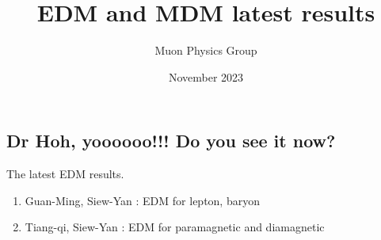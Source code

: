 \documentclass[12pt]{article}
\title{EDM and MDM latest results}
\author{Muon Physics Group}
\date{November 2023}
\begin{document}
\begin{landscape}

\section{Dr Hoh, yoooooo!!! Do you see it now?}

\noindent The latest EDM results.
\begin{enumerate}
\item Guan-Ming, Siew-Yan : EDM for lepton, baryon
\item Tiang-qi, Siew-Yan  : EDM for paramagnetic and diamagnetic
\end{enumerate}


\end{landscape}
\end{document}
